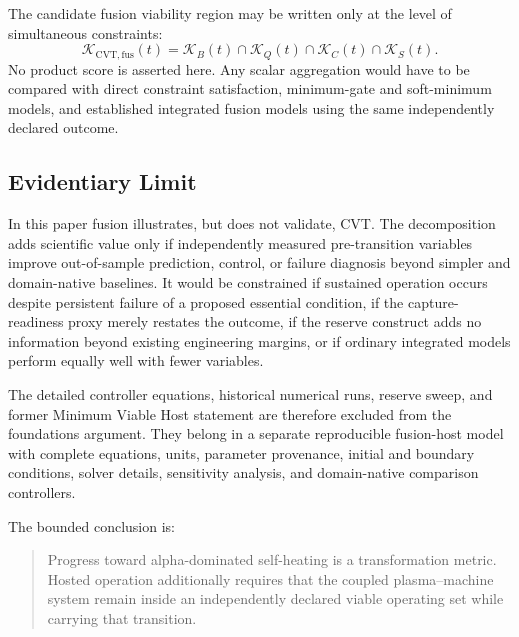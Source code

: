 The candidate fusion viability region may be written only at the level of simultaneous constraints:
\begin{equation}
    \mathcal K_{\mathrm{CVT,fus}}(t)
    =
    \mathcal K_B(t)
    \cap
    \mathcal K_Q(t)
    \cap
    \mathcal K_C(t)
    \cap
    \mathcal K_S(t).
    \label{eq:fusion-cvt-region}
\end{equation}
No product score is asserted here. Any scalar aggregation would have to be compared with direct constraint satisfaction, minimum-gate and soft-minimum models, and established integrated fusion models using the same independently declared outcome.

\subsection{Evidentiary Limit}

In this paper fusion illustrates, but does not validate, CVT. The decomposition adds scientific value only if independently measured pre-transition variables improve out-of-sample prediction, control, or failure diagnosis beyond simpler and domain-native baselines. It would be constrained if sustained operation occurs despite persistent failure of a proposed essential condition, if the capture-readiness proxy merely restates the outcome, if the reserve construct adds no information beyond existing engineering margins, or if ordinary integrated models perform equally well with fewer variables.

The detailed controller equations, historical numerical runs, reserve sweep, and former Minimum Viable Host statement are therefore excluded from the foundations argument. They belong in a separate reproducible fusion-host model with complete equations, units, parameter provenance, initial and boundary conditions, solver details, sensitivity analysis, and domain-native comparison controllers.

The bounded conclusion is:
\begin{quote}
Progress toward alpha-dominated self-heating is a transformation metric. Hosted operation additionally requires that the coupled plasma--machine system remain inside an independently declared viable operating set while carrying that transition.
\end{quote}
